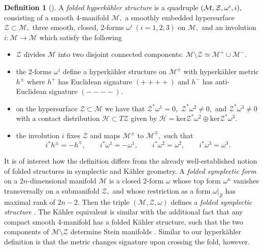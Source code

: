 \documentclass[a4paper,12pt, onecolumn, notitlepage]{article}
\theoremstyle{definition}
\newtheorem{defn}[thm]{Definition}
\theoremstyle{remark}
\newcommand{\w}{\omega}
\newcommand{\K}{K\"ahler }
\newcommand{\HK}{hyperk\"ahler }
\begin{document}
\begin{defn}[\cite{hitchin_2015,biquard_2015}]
	\label{hk_def}
	A \emph{folded \HK structure} is a quadruple $(\mathcal{M}, \mathcal{Z},\w\indices{^i}, i),$ consisting of a smooth 4-manifold $\mathcal{M},$ a smoothly embedded hypersurface $\mathcal{Z}\subset\mathcal{M},$ three smooth, closed, 2-forms $\w^{i}\ (i=1,2,3)$ on $\mathcal{M},$ and an involution $i:\mathcal{M}\to\mathcal{M}$ which satisfy the following
	\begin{itemize}
		\item $\mathcal{Z}$ divides $\mathcal{M}$ into two disjoint connected components: $\mathcal{M}\setminus \mathcal{Z}\simeq\mathcal{M}^{+}\cup\mathcal{M}^{-}.$
		\item the 2-forms $\w^{i}$ define a \HK structure on $\mathcal{M}^{\pm}$ with \HK metric $h^{\pm}$ where $h^{+}$ has Euclidean signature $(++++)$ and $h^{-}$ has anti-Euclidean signature $(----).$
		\item on the hypersurface $\mathcal{Z}\subset\mathcal{M}$ we have that $\mathcal{Z}^{\ast}\w^{1}=0,$ $\mathcal{Z}^{\ast}\w^{2}\neq0,$ and $\mathcal{Z}^{\ast}\w^{3}\neq0$ with a contact distribution $\mathcal{H}\subset T\mathcal{Z}$ given by $\mathcal{H}=\text{ker}\mathcal{Z}^{\ast}\w^{2}\oplus\text{ker}\mathcal{Z}^{\ast}\w^{3}.$
		\item the involution $i$ fixes $\mathcal{Z}$ and maps $\mathcal{M}^{\pm}$ to $\mathcal{M}^{\mp},$ such that
		\begin{equation}
		\label{def_involution}
		i^{\ast}h^{\pm} = -h^{\mp},\qquad i^{\ast}\w^{1} = -\w^{1},\qquad i^{\ast}\w^{2} = \w^{2},\qquad i^{\ast}\w^{3} = \w^{3}.
		\end{equation}
	\end{itemize}
\end{defn}
It is of interest how the definition differs from the already well-established notion of folded structures in symplectic and \K geometry. A \emph{folded symplectic form} on a $2n$-dimensional manifold $\mathcal{M}$ is a closed 2-form $\w$ whose top form $\w^{n}$ vanishes transversally on a submanifold $\mathcal{Z},$ and whose restriction as a form $\left.\w\right|_Z$ has maximal rank of $2n-2$. Then the triple $(\mathcal{M},\mathcal{Z},\w)$ defines a \emph{folded symplectic structure} \cite{dasilva_2000}. The \K equivalent is similar with the additional fact that any compact smooth 4-manifold has a folded \K structure, such that the two components of $\mathcal{M}\setminus\mathcal{Z}$ determine Stein manifolds \cite{hitchin_1987}. Similar to our \HK definition is that the metric changes signature upon crossing the fold, however.\\
\end{document}

